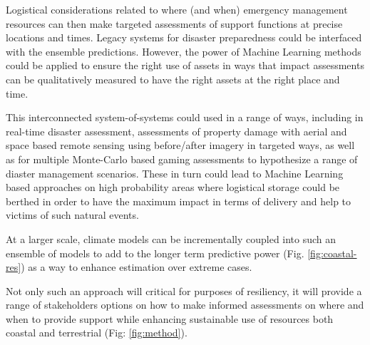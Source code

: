 Logistical considerations related to where (and when) emergency
management resources can then make targeted assessments of support
functions at precise locations and times. Legacy systems for disaster
preparedness could be interfaced with the ensemble
predictions. However, the power of Machine Learning methods could be
applied to ensure the right use of assets in ways that impact
assessments can be qualitatively measured to have the right assets at
the right place and time. 

This interconnected system-of-systems could used in a range of ways,
including in real-time disaster assessment, assessments of property
damage with aerial and space based remote sensing using before/after
imagery in targeted ways, as well as for multiple Monte-Carlo based
gaming assessments to hypothesize a range of diaster management
scenarios. These in turn could lead to Machine Learning based approaches
on high probability areas where logistical storage could be berthed in
order to have the maximum impact in terms of delivery and help to
victims of such natural events.

At a larger scale, climate models can be incrementally coupled into such
an ensemble of models to add to the longer term predictive power
(Fig. \ref{fig:coastal-res}) as a way to enhance estimation over extreme
cases.

Not only such an approach will critical for purposes of resiliency, it
will provide a range of stakeholders options on how to make informed
assessments on where and when to provide support while enhancing
sustainable use of resources both coastal and terrestrial (Fig:
\ref{fig:method}).

